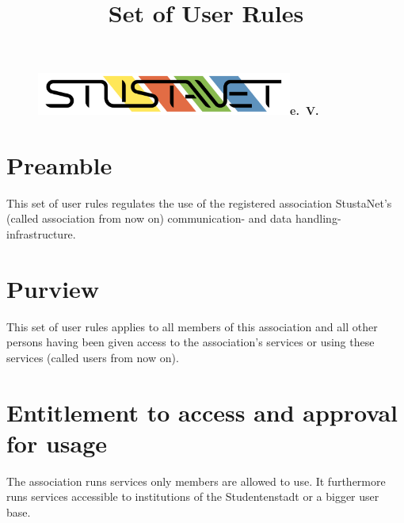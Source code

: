 \documentclass[a4paper,10pt]{scrartcl}
\title{Set of User Rules}
\date{}
\begin{document}

 \maketitle
 \vspace{-60pt}

 \begin{figure}[t!]
    \centering
    \vspace{-40pt}
    \mbox{\includegraphics[width=0.75\textwidth,keepaspectratio]{StuStaNet_Logo}\Huge \sffamily \textbf{e. V.}}
   \vspace{-40pt}
 \end{figure}

 \section*{}

 \section*{Preamble}
 This set of user rules regulates the use of the registered association StustaNet's (called association from now on)  communication- and data handling-infrastructure.

 \section{Purview}
 This set of user rules applies to all members of this association and all other persons having been given access to the association's services or using these services (called users from now on).

 \section{Entitlement to access and approval for usage}
 The association runs services only members are allowed to use. It furthermore runs services accessible to institutions of the Studentenstadt or a bigger user base.
\end{document}
